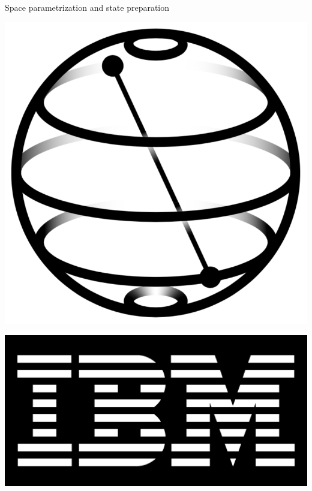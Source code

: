 \documentclass[9pt, handout, aspectratio=169]{beamer}	%
\begin{document}
\begin{frame}{Space parametrization and state preparation}
\begin{multicols}{2}
		\begin{center}
			\includegraphics[width=.2\paperwidth]{Figures/qiskit}
		\end{center}
		\begin{center}
			\includegraphics[width=.1\paperwidth]{Figures/ibm}
		\end{center}

	\end{multicols}

\end{frame}

\end{document}
